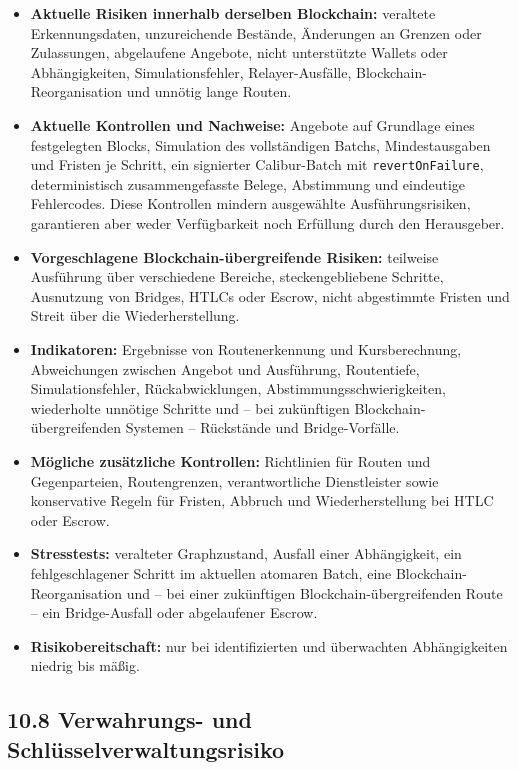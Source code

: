 \documentclass[11pt]{article}
\begin{document}
\begin{itemize}[leftmargin=*]
\item \textbf{Aktuelle Risiken innerhalb derselben Blockchain:} veraltete Erkennungsdaten, unzureichende Bestände, Änderungen an Grenzen oder Zulassungen, abgelaufene Angebote, nicht unterstützte Wallets oder Abhängigkeiten, Simulationsfehler, Relayer-Ausfälle, Blockchain-Reorganisation und unnötig lange Routen.
\item \textbf{Aktuelle Kontrollen und Nachweise:} Angebote auf Grundlage eines festgelegten Blocks, Simulation des vollständigen Batchs, Mindestausgaben und Fristen je Schritt, ein signierter Calibur-Batch mit \texttt{revertOnFailure}, deterministisch zusammengefasste Belege, Abstimmung und eindeutige Fehlercodes. Diese Kontrollen mindern ausgewählte Ausführungsrisiken, garantieren aber weder Verfügbarkeit noch Erfüllung durch den Herausgeber.
\item \textbf{Vorgeschlagene Blockchain-übergreifende Risiken:} teilweise Ausführung über verschiedene Bereiche, steckengebliebene Schritte, Ausnutzung von Bridges, HTLCs oder Escrow, nicht abgestimmte Fristen und Streit über die Wiederherstellung.
\item \textbf{Indikatoren:} Ergebnisse von Routenerkennung und Kursberechnung, Abweichungen zwischen Angebot und Ausführung, Routentiefe, Simulationsfehler, Rückabwicklungen, Abstimmungsschwierigkeiten, wiederholte unnötige Schritte und -- bei zukünftigen Blockchain-übergreifenden Systemen -- Rückstände und Bridge-Vorfälle.
\item \textbf{Mögliche zusätzliche Kontrollen:} Richtlinien für Routen und Gegenparteien, Routengrenzen, verantwortliche Dienstleister sowie konservative Regeln für Fristen, Abbruch und Wiederherstellung bei HTLC oder Escrow.
\item \textbf{Stresstests:} veralteter Graphzustand, Ausfall einer Abhängigkeit, ein fehlgeschlagener Schritt im aktuellen atomaren Batch, eine Blockchain-Reorganisation und -- bei einer zukünftigen Blockchain-übergreifenden Route -- ein Bridge-Ausfall oder abgelaufener Escrow.
\item \textbf{Risikobereitschaft:} nur bei identifizierten und überwachten Abhängigkeiten niedrig bis mäßig.
\end{itemize}
\subsection*{10.8 Verwahrungs- und Schlüsselverwaltungsrisiko}
\end{document}
